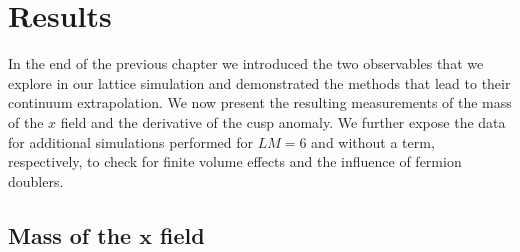 \chapter{Results}
In the end of the previous chapter we introduced the two observables that we explore in our lattice simulation and demonstrated the methods that lead to their continuum extrapolation. We now present the resulting measurements of the mass of the $x$ field and the derivative of the cusp anomaly. We further expose the data for additional simulations performed for $LM=6$ and without a  term, respectively, to check for finite volume effects and the influence of fermion doublers.
%
%
%
%
%
%
\section[Mass of the $x$ field]{Mass of the $\mathbf{x}$ field}
%
%
%
%
